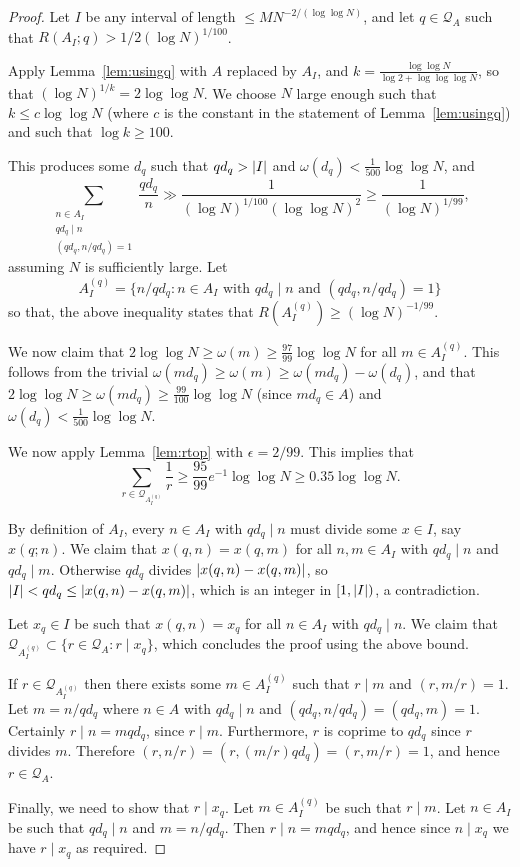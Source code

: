 \begin{proof}
Let $I$ be any interval of length $\leq MN^{-2/(\log\log N)}$, and let $q\in\mathcal{Q}_A$ such that $R(A_I;q)> 1/2(\log N)^{1/100}$.

Apply Lemma~\ref{lem:usingq} with $A$ replaced by $A_I$, and $k=\frac{\log\log N}{\log 2+\log\log\log N}$, so that $(\log N)^{1/k}=2\log\log N$. We choose $N$ large enough such that $k\leq c\log\log N$ (where $c$ is the constant in the statement of Lemma~\ref{lem:usingq}) and such that $\log k\geq 100$. 

This produces some $d_q$ such that $qd_q>\left\lvert I\right\rvert$ and $\omega(d_q)<\tfrac{1}{500}\log\log N$, and
  \[\sum_{\substack{n\in A_I\\ qd_q\mid n\\ (qd_q,n/qd_q)=1}}\frac{qd_q}{n}\gg \frac{1}{(\log N)^{1/100}(\log\log N)^2}\geq \frac{1}{(\log N)^{1/99}},\]
assuming $N$ is sufficiently large. Let
  \[A_I^{(q)}=\{ n/qd_q : n\in A_I\textrm{ with }qd_q\mid n\textrm{ and }(qd_q,n/qd_q)=1\}\]
  so that, the above inequality states that $R(A_I^{(q)})\geq (\log N)^{-1/99}$. 
  
We now claim that $2\log\log N\geq \omega(m) \geq \tfrac{97}{99}\log\log N$ for all $m\in A_I^{(q)}$. This follows from the trivial $\omega(md_q)\geq \omega(m)\geq \omega(md_q)-\omega(d_q)$, and that $2\log\log N\geq \omega(md_q)\geq  \frac{99}{100}\log\log N$ (since $md_q\in A$) and $\omega(d_q)<\frac{1}{500}\log\log N$.
  
We now apply Lemma~\ref{lem:rtop} with $\epsilon=2/99$. This implies that
  \[\sum_{r\in \mathcal{Q}_{A_I^{(q)}}}\frac{1}{r}\geq \frac{95}{99}e^{-1}\log\log N\geq 0.35\log\log N.\]

  
    By definition of $A_I$, every $n\in A_I$ with $qd_q\mid n$ must divide some $x\in I$, say $x(q;n)$. We claim that $x(q,n)=x(q,m)$ for all $n,m\in A_I$ with $qd_q\mid n$ and $qd_q\mid m$. Otherwise $qd_q$ divides $\left\lvert x(q,n)-x(q,m)\right\rvert$, so $\left\lvert I\right\rvert<qd_q\leq \left\lvert x(q,n)-x(q,m)\right\rvert$, which is an integer in $[1,\left\lvert I\right\rvert)$, a contradiction.
  
  Let $x_q\in I$ be such that $x(q,n)=x_q$ for all $n\in A_I$ with $qd_q \mid n$. We claim that $\mathcal{Q}_{A_I^{(q)}}\subset \{ r\in \mathcal{Q}_A : r\mid x_q\}$, which concludes the proof using the above bound.
  
If $r\in \mathcal{Q}_{A_I^{(q)}}$ then there exists some $m\in A_I^{(q)}$ such that $r\mid m$ and $(r,m/r)=1$. Let $m=n/qd_q$ where $n\in A$ with $qd_q\mid n$ and $(qd_q,n/qd_q)=(qd_q,m)=1$. Certainly $r\mid n = mqd_q$, since $r\mid m$. Furthermore, $r$ is coprime to $qd_q$ since $r$ divides $m$. Therefore $(r,n/r)=(r,(m/r)qd_q)=(r,m/r)=1$, and hence $r\in \mathcal{Q}_A$. 

Finally, we need to show that $r\mid x_q$. Let $m\in A_I^{(q)}$ be such that $r\mid m$. Let $n\in A_I$ be such that $qd_q\mid n$ and $m=n/qd_q$. Then $r\mid n=mqd_q$, and hence since $n\mid x_q$ we have $r\mid x_q$ as required.  
\end{proof}

